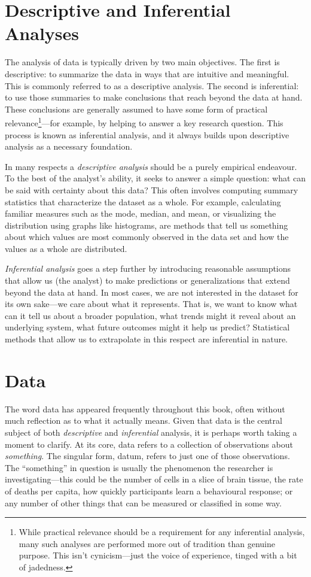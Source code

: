 \section{Descriptive and Inferential Analyses}

The analysis of data is typically driven by two main objectives. The first is descriptive: to summarize the data in ways that are intuitive and meaningful. This is commonly referred to as a \gls{descriptive analysis}. The second is inferential: to use those summaries to make conclusions that reach beyond the data at hand. These conclusions are generally assumed to have some form of practical relevance\footnote{While practical relevance should be a requirement for any inferential analysis, many such analyses are performed more out of tradition than genuine purpose. This isn't cynicism—just the voice of experience, tinged with a bit of jadedness.}—for example, by helping to answer a key research question. This process is known as \gls{inferential analysis}, and it always builds upon descriptive analysis as a necessary foundation.

In many respects a \textit{descriptive analysis} should be a purely empirical endeavour. To the best of the analyst’s ability, it seeks to answer a simple question: what can be said with certainty about this data? This often involves computing summary statistics that characterize the dataset as a whole. For example, calculating familiar measures such as the mode, median, and mean, or visualizing the distribution using graphs like histograms, are methods that tell us something about which values are most commonly observed in the data set and how the values as a whole are distributed.

\textit{Inferential analysis} goes a step further by introducing reasonable assumptions that allow us (the analyst) to make predictions or generalizations that extend beyond the data at hand. In most cases, we are not interested in the dataset for its own sake—we care about what it represents. That is, we want to know what can it tell us about a broader population, what trends might it reveal about an underlying system, what future outcomes might it help us predict? Statistical methods that allow us to extrapolate in this respect are inferential in nature.

\section{Data}

The word data has appeared frequently throughout this book, often without much reflection as to what it actually means. Given that data is the central subject of both \textit{descriptive} and \textit{inferential} analysis, it is perhaps worth taking a moment to clarify. At its core, \gls{data} refers to a collection of observations about \textit{something}. The singular form, \gls{datum}, refers to just one of those observations. The ``something'' in question is usually the phenomenon the researcher is investigating—this could be the number of cells in a slice of brain tissue, the rate of deaths per capita, how quickly participants learn a behavioural response; or any number of other things that can be measured or classified in some way. 

